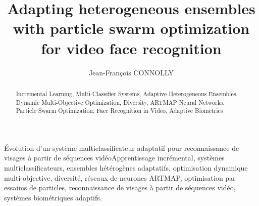 \documentclass[letterpaper, twoside, 12pt,
               thesepararticles, creativecommons]{thETS}
\title{Adapting heterogeneous ensembles with particle swarm optimization for video face recognition}
\author{Jean-Fran\c{c}ois CONNOLLY}
\begin{document}
\maketitle
\presentjury

\begin{acknowledgements}
	
\end{acknowledgements}
\clearpage

\begin{abstract}{Incremental Learning, Multi-Classifier Systems, Adaptive Heterogeneous Ensembles, Dynamic Multi-Objective Optimization, Diversity, ARTMAP Neural Networks, Particle Swarm Optimization, Face Recognition in Video, Adaptive Biometrics} 
\end{abstract}

\begin{sommaire}{Évolution d'un système multiclassificateur adaptatif pour reconnaissance de visages à partir de séquences vidéo}{Apprentissage incrémental, systèmes multiclassificateurs, ensembles hétérogènes adaptatifs, optimisation dynamique multi-objective, diversité, réseaux de neurones ARTMAP, optimisation par essaims de particles, reconnaissance de visages à partir de séquences vidéo, systèmes biométriques adaptifs.}



\end{sommaire}

\tableofcontents    %
\listoftables       %
\listoffigures      %

\begin{listofabbr}[3cm]
	
\end{listofabbr}

\begin{listofsymbols}[3cm]
	
\end{listofsymbols}

\clearpage

\end{document}

